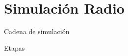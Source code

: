 \section[Simulaci\'on]{Simulaci\'on Radio}



\begin{frame}{Cadena de simulaci\'on}
\footnotesize
	\begin{block}{Etapas}
		\begin{center}
		\end{center}
	\end{block}
\end{frame}


% 


